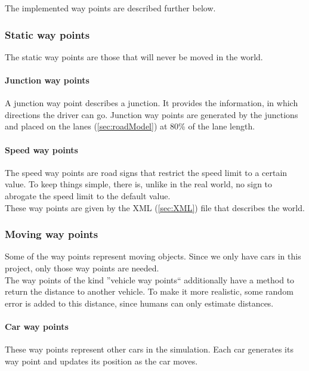 The implemented way points are described further below.

\subsubsection{Static way points}

The static way points are those that will never be moved in the world.

\paragraph{Junction way points}
A junction way point describes a junction. It provides the information, in
which directions the driver can go. Junction way points are generated by the
junctions and placed on the lanes (\ref{sec:roadModel}) at 80\% of the lane
length.

\paragraph{Speed way points}
The speed way points are road signs that restrict the speed limit to a certain
value. To keep things simple, there is, unlike in the real world, no sign to 
abrogate the speed limit to the default value. \\

These way points are given by the XML (\ref{sec:XML}) file that describes the 
world.

\subsubsection{Moving way points}

Some of the way points represent moving objects. Since we only have cars in this
project, only those way points are needed. \\

The way points of the kind ''vehicle way points`` additionally have a method to 
return the distance to another vehicle. To make it more realistic, some random 
error is added to this distance, since humans can only estimate distances.

\paragraph{Car way points}

These way points represent other cars in the simulation. Each car generates its
way point and updates its position as the car moves.


